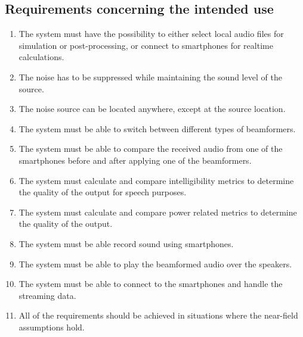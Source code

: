 \subsection{Requirements concerning the intended use}
\begin{enumerate}
\item The system must have the possibility to either select local audio files for simulation or post-processing, or connect to smartphones for realtime calculations.
\item The noise has to be suppressed while maintaining the sound level of the source.
\item The noise source can be located anywhere, except at the source location.
\item The system must be able to switch between different types of beamformers.
\item The system must be able to compare the received audio from one of the smartphones before and after applying one of the beamformers.
\item The system must calculate and compare intelligibility metrics to determine the quality of the output for speech purposes.
\item The system must calculate and compare power related metrics to determine the quality of the output.
\item The system must be able record sound using smartphones.
\item The system must be able to play the beamformed audio over the speakers.
\item The system must be able to connect to the smartphones and handle the streaming data.
\item All of the requirements should be achieved in situations where the near-field assumptions hold.
\end{enumerate}





